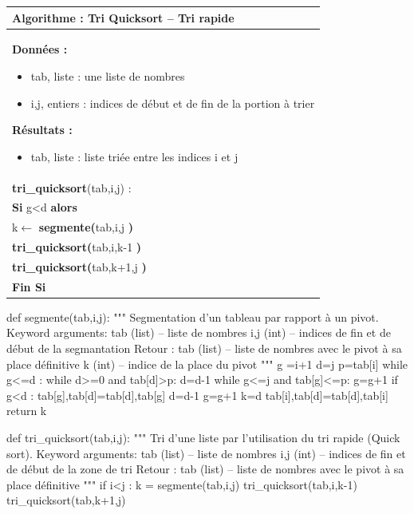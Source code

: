 \documentclass[10pt]{article}
\begin{document}
\begin{pseudo}
\begin{center}
\begin{tabular}{p{}}
\hline
\textbf{Algorithme :} Tri Quicksort -- Tri rapide\\
\hline
\textbf{Données :}
\begin{itemize}
\item \textsf{tab}, liste : une liste de nombres
\item \textsf{i,j}, entiers : indices de début et de fin de la portion à trier
\end{itemize}
\textbf{Résultats :} 
\begin{itemize}
\item \textsf{tab}, liste : liste triée entre les indices \textsf{i} et \textsf{j}
\end{itemize}
\\
\textbf{tri\_quicksort}(\textsf{tab,i,j}) :\\
\hspace{.4cm} \textbf{Si} \textsf{g<d} \textbf{alors} \\
\hspace{.8cm} \textsf{k$\leftarrow$} \textbf{segmente(}\textsf{tab,i,j} \textbf{)} \\
\hspace{.8cm} \textbf{tri\_quicksort(}\textsf{tab,i,k-1} \textbf{)} \\
\hspace{.8cm} \textbf{tri\_quicksort(}\textsf{tab,k+1,j} \textbf{)} \\
\hspace{.4cm} \textbf{Fin Si} \\
\hline
\end{tabular}
\end{center}
\end{pseudo}

\begin{py}
\begin{python}
def segmente(tab,i,j):
    """
    Segmentation d'un tableau par rapport à un pivot.
    Keyword arguments: 
    tab (list) -- liste de nombres
    i,j (int) -- indices de fin et de début de la segmantation
    Retour :    
    tab (list) -- liste de nombres avec le pivot à sa place définitive
    k (int) -- indice de la place du pivot
    """
    g =i+1
    d=j
    p=tab[i]
    while g<=d :
        while d>=0 and tab[d]>p:
            d=d-1
        while g<=j and tab[g]<=p:
            g=g+1
        if g<d :
            tab[g],tab[d]=tab[d],tab[g]
            d=d-1
            g=g+1
    k=d
    tab[i],tab[d]=tab[d],tab[i]
    return k
\end{python}

\begin{python}
def tri_quicksort(tab,i,j):
    """
    Tri d'une liste par l'utilisation du tri rapide (Quick sort).
    Keyword arguments: 
    tab (list) -- liste de nombres
    i,j (int) -- indices de fin et de début de la zone de tri
    Retour :    
    tab (list) -- liste de nombres avec le pivot à sa place définitive
    """
    if i<j :
        k = segmente(tab,i,j)
        tri_quicksort(tab,i,k-1)
        tri_quicksort(tab,k+1,j)
\end{python}
\end{py}
\end{document}
